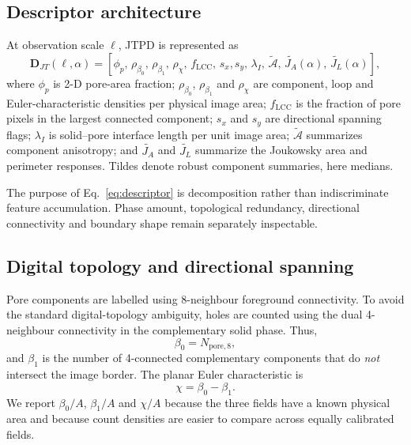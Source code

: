 \documentclass[preprint,12pt,authoryear]{elsarticle}
\begin{document}
\subsection{Descriptor architecture}

At observation scale $\ell$, JTPD is represented as
\begin{equation}
\mathbf{D}_{JT}(\ell,\alpha)=
\left[
\phi_p,\,
\rho_{\beta_0},\,
\rho_{\beta_1},\,
\rho_{\chi},\,
f_{\mathrm{LCC}},\,
s_x,s_y,\,
\lambda_I,\,
\widetilde{\mathcal A},\,
\widetilde{J_A}(\alpha),\,
\widetilde{J_L}(\alpha)
\right],
\label{eq:descriptor}
\end{equation}
where $\phi_p$ is 2-D pore-area fraction; $\rho_{\beta_0}$, $\rho_{\beta_1}$ and $\rho_\chi$ are component, loop and Euler-characteristic densities per physical image area; $f_{\mathrm{LCC}}$ is the fraction of pore pixels in the largest connected component; $s_x$ and $s_y$ are directional spanning flags; $\lambda_I$ is solid--pore interface length per unit image area; $\widetilde{\mathcal A}$ summarizes component anisotropy; and $\widetilde{J_A}$ and $\widetilde{J_L}$ summarize the Joukowsky area and perimeter responses. Tildes denote robust component summaries, here medians.

The purpose of Eq.~\ref{eq:descriptor} is decomposition rather than indiscriminate feature accumulation. Phase amount, topological redundancy, directional connectivity and boundary shape remain separately inspectable.

\subsection{Digital topology and directional spanning}

Pore components are labelled using 8-neighbour foreground connectivity. To avoid the standard digital-topology ambiguity, holes are counted using the dual 4-neighbour connectivity in the complementary solid phase. Thus,
\begin{equation}
\beta_0=N_{\mathrm{pore},8},
\end{equation}
and $\beta_1$ is the number of 4-connected complementary components that do \emph{not} intersect the image border. The planar Euler characteristic is
\begin{equation}
\chi=\beta_0-\beta_1.
\end{equation}
We report $\beta_0/A$, $\beta_1/A$ and $\chi/A$ because the three fields have a known physical area and because count densities are easier to compare across equally calibrated fields.
\end{document}
